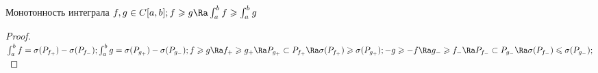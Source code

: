 \begin{theorem}{Монотонность интеграла}
	$ f, g \in C[a, b]; f \geqslant g \Ra \int_a^b f \geqslant \int_a^b g $
\end{theorem}
\begin{proof}
	$ \int_a^b f = \sigma (P_{f_+}) - \sigma (P_{f_-}); \int_a^b g = \sigma (P_{g_+}) - \sigma (P_{g_-});
	f \geqslant g \Ra f_+ \geqslant g_+ \Ra P_{g_+} \subset P_{f_+} \Ra \sigma(P_{f_+}) \geqslant \sigma(P_{g_+});
	-g \geqslant -f \Ra  g_-  \geqslant f_- \Ra P_{f_-} \subset P_{g_-} \Ra \sigma(P_{f_-}) \leqslant \sigma(P_{g_-});$
\end{proof}